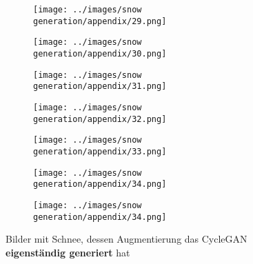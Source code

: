 \begin{figure}[H]
\begin{subfigure}[b]{0.1\textwidth}
\end{subfigure}
\hspace{1em}%
\begin{subfigure}[b]{0.1\textwidth}
\centering
\texttt{[image: ../images/snow generation/appendix/29.png]}
\end{subfigure}
\hspace{1em}%
\begin{subfigure}[b]{0.1\textwidth}
\centering
\texttt{[image: ../images/snow generation/appendix/30.png]}
\end{subfigure}
\hspace{1em}%
\begin{subfigure}[b]{0.1\textwidth}
\centering
\texttt{[image: ../images/snow generation/appendix/31.png]}
\end{subfigure}
\hspace{1em}%
\begin{subfigure}[b]{0.1\textwidth}
\centering
\texttt{[image: ../images/snow generation/appendix/32.png]}
\end{subfigure}
\hspace{1em}%
\begin{subfigure}[b]{0.1\textwidth}
\centering
\texttt{[image: ../images/snow generation/appendix/33.png]}
\end{subfigure}
\hspace{1em}%
\begin{subfigure}[b]{0.1\textwidth}
\centering
\texttt{[image: ../images/snow generation/appendix/34.png]}
\end{subfigure}
\hspace{1em}%
\begin{subfigure}[b]{0.1\textwidth}
\centering
\texttt{[image: ../images/snow generation/appendix/34.png]}
\end{subfigure}
\caption{Bilder mit Schnee, dessen Augmentierung das \ac{CycleGAN} \textbf{eigenständig generiert} hat}
\label{fig:snow-imgs-generated}
\end{figure}

